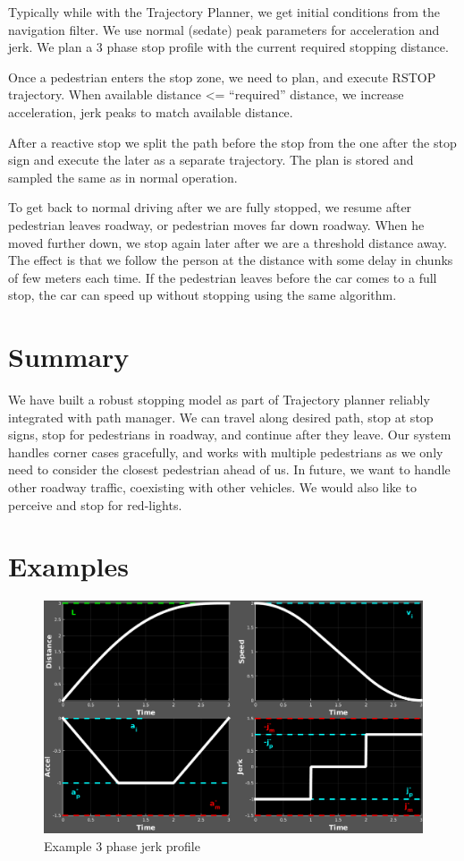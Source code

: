 \documentclass[letterpaper, 10 pt, conference]{ieeeconf}  %
\begin{document}
Typically while with the Trajectory Planner, we get initial conditions from the
navigation filter. We use normal (sedate) peak parameters for acceleration
and jerk. We plan a 3 phase stop profile with the current required stopping distance.

Once a pedestrian enters the stop zone, we need to plan, and execute RSTOP trajectory.
When available distance <= “required” distance, we increase acceleration, jerk peaks to
match available distance.

After a reactive stop we split the path before the stop from the one after the stop
sign and execute the later as a separate trajectory. The plan is stored and sampled 
the same as in normal operation.

To get back to normal driving after we are fully stopped, we resume
after pedestrian leaves roadway, or pedestrian moves far down roadway.
When he moved further down, we stop again later after we are a threshold
distance away. The effect is that we follow the person at the distance with some 
delay in chunks of few meters each time. If the pedestrian leaves before 
the car comes to a full stop, the car can speed up without stopping using the 
same algorithm.


\section{Summary} \label{sec:summary}

We have built a robust stopping model as part of Trajectory planner reliably integrated with path manager.
We can travel along desired path, stop at stop signs, stop for pedestrians in roadway, and continue after 
they leave. Our system handles corner cases gracefully, and works with multiple pedestrians as we only 
need to consider the closest pedestrian ahead of us. In future, we want to handle other roadway traffic, 
coexisting with other vehicles. We would also like to perceive and stop for red-lights.

\section{Examples}

\begin{figure}[thpb]
  \centering
  \includegraphics[width=1.0\columnwidth]{graphics/FullStopSpec.png}
  \caption{Example 3 phase jerk profile}
  \label{fig:3phase}
\end{figure}
\end{document}
